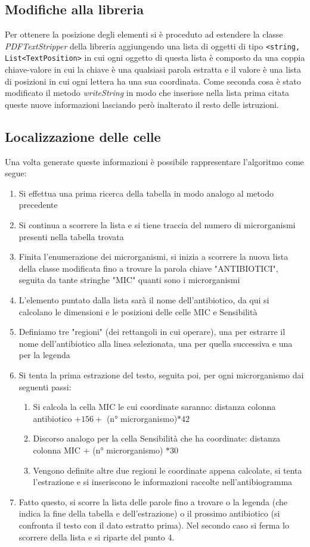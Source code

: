 \subsection{Modifiche alla libreria}
Per ottenere la posizione degli elementi si è proceduto ad estendere la classe \textit{PDFTextStripper} della libreria aggiungendo una lista di oggetti di tipo \texttt{<string, List<TextPosition>} in cui ogni oggetto di questa lista è composto da una coppia chiave-valore in cui la chiave è una qualsiasi parola estratta e il valore è una lista di posizioni in cui ogni lettera ha una sua coordinata.
Come seconda cosa è stato modificato il metodo \textit{writeString} in modo che inserisse nella lista prima citata queste nuove informazioni lasciando però inalterato il resto delle istruzioni.
\newline
\subsection{Localizzazione delle celle}\label{Algoritmo finale}
Una volta generate queste informazioni è possibile rappresentare l'algoritmo come segue:
\begin{enumerate}
	\item Si effettua una prima ricerca della tabella in modo analogo al metodo precedente
	\item Si continua a scorrere la lista e si tiene traccia del numero di microrganismi presenti nella tabella trovata
	\item Finita l'enumerazione dei microrganismi, si inizia a scorrere la nuova lista della classe modificata fino a trovare la parola chiave "ANTIBIOTICI", seguita da tante stringhe "MIC" quanti sono i microrganismi
	\item L'elemento puntato dalla lista sarà il nome dell'antibiotico, da qui si calcolano le dimensioni e le posizioni delle celle MIC e Sensibilità
	\item Definiamo tre "regioni" (dei rettangoli in cui operare), una per estrarre il nome dell'antibiotico alla linea selezionata, una per quella successiva e una per la legenda
	\item Si tenta la prima estrazione del testo, seguita poi, per ogni microrganismo dai seguenti passi:
	\begin{enumerate}
		\item Si calcola la cella MIC le cui coordinate saranno: distanza colonna antibiotico $ + 156 + $ (n° microrganismo)$* 42$
		\item Discorso analogo per la cella Sensibilità che ha coordinate: distanza colonna MIC $ + $ (n° microrganismo) $* 30$
		\item Vengono definite altre due regioni le coordinate appena calcolate, si tenta l'estrazione e si inseriscono le informazioni raccolte nell'antibiogramma
		\end{enumerate}
		\item Fatto questo, si scorre la lista delle parole fino a trovare o la legenda (che indica la fine della tabella e dell'estrazione) o il prossimo antibiotico (si confronta il testo con il dato estratto prima). Nel secondo caso si ferma lo scorrere della lista e si riparte del punto 4.
\end{enumerate}
		
